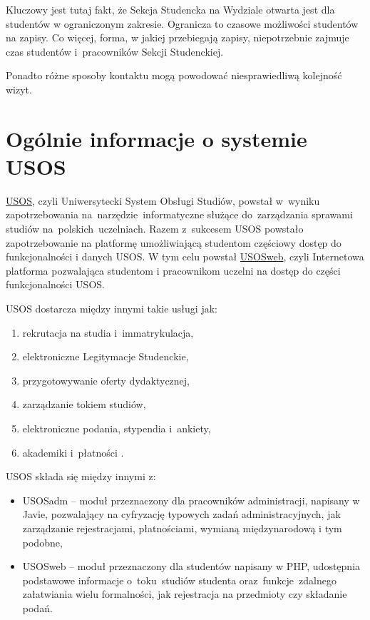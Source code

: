 \documentclass[licencjacka]{pracamgr}
\begin{document}
Kluczowy jest tutaj fakt, że Sekcja Studencka na Wydziale otwarta jest dla studentów w ograniczonym zakresie. Ogranicza to czasowe możliwości studentów na zapisy. Co więcej, forma, w jakiej przebiegają zapisy, niepotrzebnie zajmuje czas studentów i~pracowników Sekcji Studenckiej.

Ponadto różne sposoby kontaktu mogą powodować niesprawiedliwą kolejność wizyt.


\section{Ogólnie informacje o systemie USOS}
\href{http://usos.edu.pl}{USOS}, czyli Uniwersytecki System Obsługi Studiów, powstał w~wyniku zapotrzebowania na~narzędzie~informatyczne służące do~zarządzania sprawami studiów na~polskich~uczelniach. Razem z~sukcesem USOS powstało zapotrzebowanie na platformę umożliwiającą studentom częściowy dostęp do funkcjonalności i danych USOS. W tym celu powstał \href{htpp://usosweb.uw.edu.pl}{USOSweb}, czyli Internetowa platforma pozwalająca studentom i pracownikom uczelni na dostęp do części funkcjonalności USOS.

USOS dostarcza między innymi takie usługi jak:
\begin{enumerate}
\item rekrutacja na studia i~immatrykulacja,
\item elektroniczne Legitymacje Studenckie,
\item przygotowywanie oferty dydaktycznej,
\item zarządzanie tokiem studiów,
\item elektroniczne podania, stypendia i~ankiety,
\item akademiki i~płatności \cite{usosstart}.
\end{enumerate}

USOS składa się między innymi z:
\begin{itemize}
\item USOSadm -- moduł przeznaczony dla pracowników administracji, napisany w Javie, pozwalający na cyfryzację typowych zadań administracyjnych, jak zarządzanie rejestracjami, płatnościami, wymianą międzynarodową i tym podobne,
\item USOSweb -- moduł przeznaczony dla studentów napisany w PHP, udostępnia podstawowe informacje o~toku~studiów studenta oraz~funkcje~zdalnego załatwiania wielu formalności, jak rejestracja na przedmioty czy składanie podań.
\end{itemize}
\end{document}

